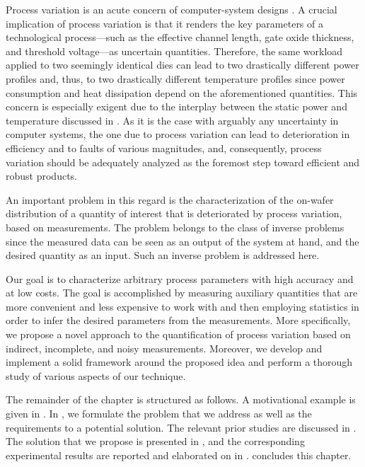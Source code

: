 Process variation is an acute concern of computer-system designs
\cite{chandrakasan2000, srivastava2010}. A crucial implication of process
variation is that it renders the key parameters of a technological
process---such as the effective channel length, gate oxide thickness, and
threshold voltage---as uncertain quantities. Therefore, the same workload
applied to two seemingly identical dies can lead to two drastically different
power profiles and, thus, to two drastically different temperature profiles
since power consumption and heat dissipation depend on the aforementioned
quantities. This concern is especially exigent due to the interplay between the
static power and temperature \cite{liu2007, srivastava2010} discussed in
. As it is the case with arguably any uncertainty in computer
systems, the one due to process variation can lead to deterioration in
efficiency and to faults of various magnitudes, and, consequently, process
variation should be adequately analyzed as the foremost step toward efficient
and robust products.

An important problem in this regard is the characterization of the on-wafer
distribution of a quantity of interest that is deteriorated by process
variation, based on measurements. The problem belongs to the class of inverse
problems since the measured data can be seen as an output of the system at hand,
and the desired quantity as an input. Such an inverse problem is addressed here.

Our goal is to characterize arbitrary process parameters with high accuracy and
at low costs. The goal is accomplished by measuring auxiliary quantities that
are more convenient and less expensive to work with and then employing
statistics in order to infer the desired parameters from the measurements. More
specifically, we propose a novel approach to the quantification of process
variation based on indirect, incomplete, and noisy measurements. Moreover, we
develop and implement a solid framework around the proposed idea and perform a
thorough study of various aspects of our technique.

The remainder of the chapter is structured as follows. A motivational example is
given in . In , we formulate
the problem that we address as well as the requirements to a potential solution.
The relevant prior studies are discussed in . The solution
that we propose is presented in , and the corresponding
experimental results are reported and elaborated on in .
 concludes this chapter.
